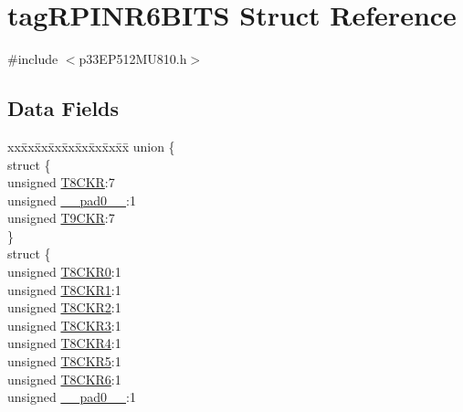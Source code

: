 \hypertarget{structtag_r_p_i_n_r6_b_i_t_s}{}\section{tag\+R\+P\+I\+N\+R6\+B\+I\+TS Struct Reference}
\label{structtag_r_p_i_n_r6_b_i_t_s}


{\ttfamily \#include $<$p33\+E\+P512\+M\+U810.\+h$>$}

\subsection*{Data Fields}
\begin{DoxyCompactItemize}
\item 
\begin{tabbing}
xx\=xx\=xx\=xx\=xx\=xx\=xx\=xx\=xx\=\kill
union \{\\
\>struct \{\\
\>\>unsigned \hyperlink{structtag_r_p_i_n_r6_b_i_t_s_a9f114ba88d048d941be1057738b88cc2}{T8CKR}:7\\
\>\>unsigned \hyperlink{structtag_r_p_i_n_r6_b_i_t_s_adf71f3d8410c1f1dbbc96680a92c49af}{\_\_pad0\_\_}:1\\
\>\>unsigned \hyperlink{structtag_r_p_i_n_r6_b_i_t_s_a01a380cf833447481123489c762a6dd4}{T9CKR}:7\\
\>\} \\
\>struct \{\\
\>\>unsigned \hyperlink{structtag_r_p_i_n_r6_b_i_t_s_a9f79c78a2e11129eb5a8fb9598d4a88e}{T8CKR0}:1\\
\>\>unsigned \hyperlink{structtag_r_p_i_n_r6_b_i_t_s_a8bbd304a694f7b0d7822621067d71584}{T8CKR1}:1\\
\>\>unsigned \hyperlink{structtag_r_p_i_n_r6_b_i_t_s_a76d77f343909eab687bf7d05ba94947b}{T8CKR2}:1\\
\>\>unsigned \hyperlink{structtag_r_p_i_n_r6_b_i_t_s_ab21d6999c42bba7171ac3d3c03707767}{T8CKR3}:1\\
\>\>unsigned \hyperlink{structtag_r_p_i_n_r6_b_i_t_s_ae0843178fa7315846e57675d8421ab72}{T8CKR4}:1\\
\>\>unsigned \hyperlink{structtag_r_p_i_n_r6_b_i_t_s_a4adb37e6bbc63d88d0bc905bce9fbd55}{T8CKR5}:1\\
\>\>unsigned \hyperlink{structtag_r_p_i_n_r6_b_i_t_s_ab5e3ad2b5340c0175f8cc3dcc4607892}{T8CKR6}:1\\
\>\>unsigned \hyperlink{structtag_r_p_i_n_r6_b_i_t_s_adf71f3d8410c1f1dbbc96680a92c49af}{\_\_pad0\_\_}:1\\

\end{tabbing}
\end{DoxyCompactItemize}
